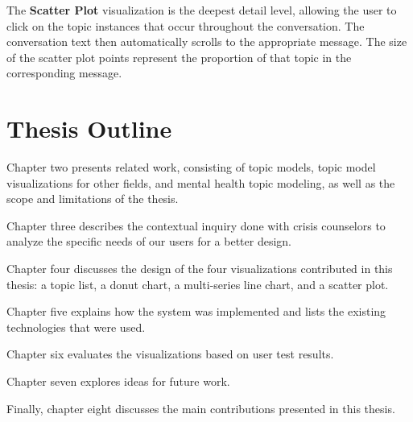 The \textbf{Scatter Plot} visualization is the deepest detail level, allowing the user to
click on the topic instances that occur throughout the conversation. The conversation
text then automatically scrolls to the appropriate message. The size of the scatter
plot points represent the proportion of that topic in the corresponding message.

\section{Thesis Outline}

Chapter two presents related work, consisting of topic models, topic model
visualizations for other fields, and mental health topic modeling, as well as the scope and
limitations of the thesis.

Chapter three describes the contextual inquiry done with crisis counselors to
analyze the specific needs of our users for a better design.

Chapter four discusses the design of the four visualizations contributed in this thesis:
a topic list, a donut chart, a multi-series line chart, and a scatter plot.

Chapter five explains how the system was implemented and lists the existing
technologies that were used.

Chapter six evaluates the visualizations based on user test results.

Chapter seven explores ideas for future work.

Finally, chapter eight discusses the main contributions presented in this thesis.
